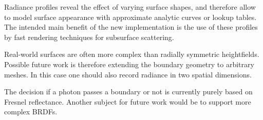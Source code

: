 \documentclass[]{article}
\begin{document}
Radiance profiles reveal the effect of varying surface shapes, and therefore allow to model surface appearance with approximate analytic curves or lookup tables. The intended main benefit of the new implementation is the use of these profiles by fast rendering techniques for subsurface scattering.

Real-world surfaces are often more complex than radially symmetric heightfields. Possible future work is therefore extending the boundary geometry to arbitrary meshes. In this case one should also record radiance in two spatial dimensions.

The decision if a photon passes a boundary or not is currently purely based on Fresnel reflectance. Another subject for future work would be to support more complex BRDFs.


\end{document}
